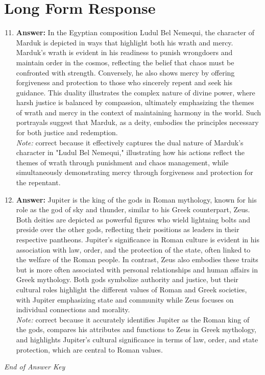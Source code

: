 \documentclass[12pt]{article}
\begin{document}
\section*{Long Form Response}
\begin{enumerate}[label=\arabic*.]
\setcounter{enumi}{10}
\item \textbf{Answer:} In the Egyptian composition Ludul Bel Nemequi, the character of Marduk is depicted in ways that highlight both his wrath and mercy. Marduk's wrath is evident in his readiness to punish wrongdoers and maintain order in the cosmos, reflecting the belief that chaos must be confronted with strength. Conversely, he also shows mercy by offering forgiveness and protection to those who sincerely repent and seek his guidance. This duality illustrates the complex nature of divine power, where harsh justice is balanced by compassion, ultimately emphasizing the themes of wrath and mercy in the context of maintaining harmony in the world. Such portrayals suggest that Marduk, as a deity, embodies the principles necessary for both justice and redemption.
\\ \textit{Note:} correct because it effectively captures the dual nature of Marduk's character in "Ludul Bel Nemequi," illustrating how his actions reflect the themes of wrath through punishment and chaos management, while simultaneously demonstrating mercy through forgiveness and protection for the repentant.
\item \textbf{Answer:} Jupiter is the king of the gods in Roman mythology, known for his role as the god of sky and thunder, similar to his Greek counterpart, Zeus. Both deities are depicted as powerful figures who wield lightning bolts and preside over the other gods, reflecting their positions as leaders in their respective pantheons. Jupiter's significance in Roman culture is evident in his association with law, order, and the protection of the state, often linked to the welfare of the Roman people. In contrast, Zeus also embodies these traits but is more often associated with personal relationships and human affairs in Greek mythology. Both gods symbolize authority and justice, but their cultural roles highlight the different values of Roman and Greek societies, with Jupiter emphasizing state and community while Zeus focuses on individual connections and morality.
\\ \textit{Note:} correct because it accurately identifies Jupiter as the Roman king of the gods, compares his attributes and functions to Zeus in Greek mythology, and highlights Jupiter's cultural significance in terms of law, order, and state protection, which are central to Roman values.
\end{enumerate}

\vfill
\noindent\textit{End of Answer Key}
\end{document}
